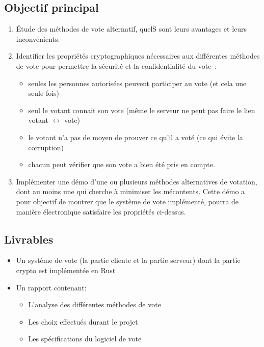 \documentclass[../report]{subfiles}
\begin{document}
\subsection{Objectif principal}\label{ssec:cdc:cdc:objprinc}
\begin{enumerate}
  \item Étude des méthodes de vote alternatif, quelS sont leurs avantages et leurs inconvénients.
  \item Identifier les propriétés cryptographiques nécessaires aux différentes méthodes de vote pour permettre la sécurité et la confidentialité du vote~:
    \begin{itemize}
      \item seules les personnes autorisées peuvent participer au vote (et cela une seule fois)
      \item seul le votant connait son vote (même le serveur ne peut pas faire le lien votant $\longleftrightarrow$ vote)
      \item le votant n'a pas de moyen de prouver ce qu'il a voté (ce qui évite la corruption)
      \item chacun peut vérifier que son vote a bien été pris en compte.
    \end{itemize}
  \item Implémenter une démo d'une ou plusieurs méthodes alternatives de votation, dont au moins une qui cherche à minimiser les mécontents. Cette démo a pour objectif de montrer que le système de vote implémenté, pourra de manière électronique satisfaire les propriétés ci-dessus.
\end{enumerate}

\subsection{Livrables}
    \begin{itemize}
      \item Un système de vote (la partie cliente et la partie serveur) dont la partie crypto est implémentée en Rust
      \item Un rapport contenant: 
      \begin{itemize}
        \item L'analyse des différentes méthodes de vote
        \item Les choix effectués durant le projet
        \item Les spécifications du logiciel de vote
      \end{itemize}
    \end{itemize}
\end{document}
